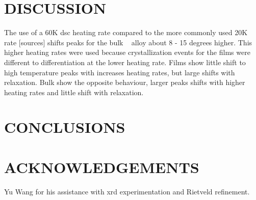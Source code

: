 \documentclass[a4paper,12pt,oneside]{article}%
\begin{document}

\section{DISCUSSION}

The use of a 60K \gls{dsc} heating rate compared to the more commonly used 20K rate [sources] shifts peaks for the bulk \MgZnCa~ alloy about 8 - 15 degrees higher. This higher heating rates were used because crystallization events for the films were different to differentiation at the lower heating rate. 
Films show little shift to high temperature peaks with increases heating rates, but large shifts with relaxation. 
Bulk show the opposite behaviour, larger peaks shifts with higher heating rates and little shift with relaxation.


\section{CONCLUSIONS}


\section{ACKNOWLEDGEMENTS}

Yu Wang for his assistance with \acrshort{xrd} experimentation and Rietveld refinement. 





\end{document}
